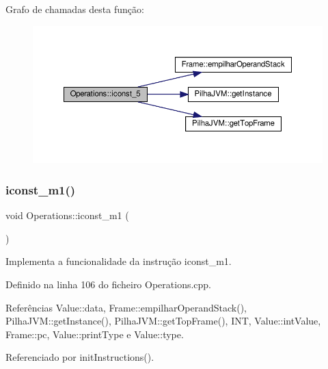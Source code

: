 Grafo de chamadas desta função\+:
\nopagebreak
\begin{figure}[H]
\begin{center}
\leavevmode
\includegraphics[width=350pt]{classOperations_a87a4c7214825d084ded4a8ea50e4af7c_cgraph}
\end{center}
\end{figure}
\mbox{\label{classOperations_abb57552d42047d4b685b2d68db6b1fd7}} 
\subsubsection{\texorpdfstring{iconst\+\_\+m1()}{iconst\_m1()}}
{\footnotesize\ttfamily void Operations\+::iconst\+\_\+m1 (\begin{DoxyParamCaption}{ }\end{DoxyParamCaption})\hspace{0.3cm}{\ttfamily [private]}}



Implementa a funcionalidade da instrução iconst\+\_\+m1. 



Definido na linha 106 do ficheiro Operations.\+cpp.



Referências Value\+::data, Frame\+::empilhar\+Operand\+Stack(), Pilha\+J\+V\+M\+::get\+Instance(), Pilha\+J\+V\+M\+::get\+Top\+Frame(), I\+NT, Value\+::int\+Value, Frame\+::pc, Value\+::print\+Type e Value\+::type.



Referenciado por init\+Instructions().

